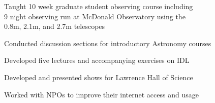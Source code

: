 
Taught 10 week graduate student observing course including \\
9 night observing run at McDonald Observatory using the\\
 0.8m, 2.1m, and 2.7m telescopes

Conducted discussion sections for introductory Astronomy courses

Developed five lectures and accompanying exercises on IDL

Developed and presented shows for Lawrence Hall of Science

Worked with NPOs to improve their internet access and usage
